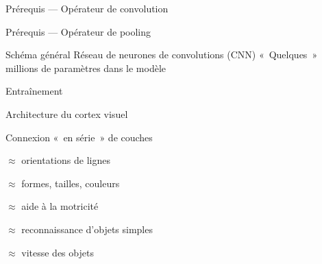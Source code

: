 \begin{frame}{Prérequis --- Opérateur de convolution}
\end{frame}

\begin{frame}{Prérequis --- Opérateur de pooling}
\end{frame}

\begin{frame}{Schéma général}
  Réseau de neurones de convolutions (CNN)
  «~Quelques~» millions de paramètres dans le modèle
\end{frame}

\begin{frame}{Entraînement}
\end{frame}

\begin{frame}{Architecture du cortex visuel}
  \begin{minipage}[l]{0.50\linewidth}
  \end{minipage}\hfill
  \begin{minipage}[l]{0.49\linewidth}
    Connexion «~en série~» de couches
    \begin{description}[<+->]
    \item[V1] $\approx$ orientations de lignes
    \item[V2] $\approx$ formes, tailles, couleurs
    \item[V3] $\approx$ aide à la motricité
    \item[V4] $\approx$ reconnaissance d'objets simples
    \item[V5] $\approx$ vitesse des objets
    \end{description}
  \end{minipage}\hfill
\end{frame}
